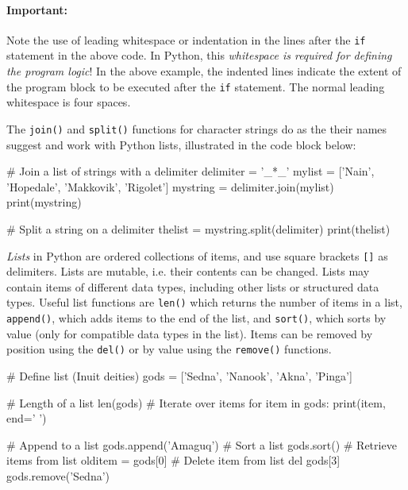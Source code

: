 \begin{tcolorbox}[colback=alert]
\paragraph{Important:} Note the use of leading whitespace or indentation in the lines after the \texttt{if} statement in the above code. In Python, this \emph{whitespace is required for defining the program logic}! In the above example, the indented lines indicate the extent of the program block to be executed after the \texttt{if} statement. The normal leading whitespace is four spaces. 
\end{tcolorbox}

The \texttt{join()} and \texttt{split()} functions for character strings do as the their names suggest and work with Python lists, illustrated in the code block below:

\begin{samepage}
\begin{pythoncode}
# Join a list of strings with a delimiter
delimiter = '_*_'
mylist = ['Nain', 'Hopedale', 'Makkovik', 'Rigolet']
mystring = delimiter.join(mylist)
print(mystring)

# Split a string on a delimiter
thelist = mystring.split(delimiter)
print(thelist)
\end{pythoncode}
\end{samepage}

\emph{Lists} in Python are ordered collections of items, and use square brackets \texttt{[]} as delimiters. Lists are mutable, i.e. their contents can be changed. Lists may contain items of different data types, including other lists or structured data types. Useful list functions are \texttt{len()} which returns the number of items in a list, \texttt{append()}, which adds items to the end of the list, and \texttt{sort()}, which sorts by value (only for compatible data types in the list). Items can be removed by position using the \texttt{del()} or by value using the \texttt{remove()} functions.

\begin{samepage}
\begin{pythoncode}
# Define list (Inuit deities)
gods = ['Sedna', 'Nanook', 'Akna', 'Pinga']

# Length of a list
len(gods)
# Iterate over items
for item in gods:
    print(item, end=' ')

# Append to a list
gods.append('Amaguq')
# Sort a list
gods.sort()
# Retrieve items from list
olditem = gods[0]
# Delete item from list
del gods[3]
gods.remove('Sedna')
\end{pythoncode}
\end{samepage}

